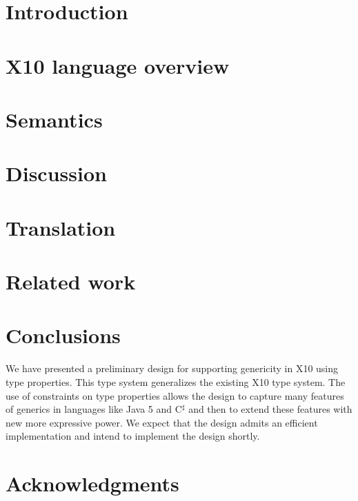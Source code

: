 \documentclass[preprint,nocopyrightspace,9pt]{sigplanconf}
\newcommand\csharp{C$^{\sharp}$\xspace}
\begin{document}
\section{Introduction}
\label{sec:intro}


\section{X10 language overview}
\label{sec:lang}


\section{Semantics}
\label{sec:semantics}


\eat{}

\section{Discussion}
\label{sec:discussion}


\section{Translation}
\label{sec:translation}
\label{sec:impl}


\section{Related work}
\label{sec:related}


\section{Conclusions}
\label{sec:conclusions}


We have presented a preliminary design for supporting genericity
in X10 using type properties.  This type system generalizes the
existing X10 type system.  The use of constraints on type
properties allows
the design to capture many features of generics in languages
like Java 5 and \csharp and then to extend these features with new
more expressive power.
We expect that the design admits an efficient
implementation and intend to implement the design shortly.

\section*{Acknowledgments} 
\end{document}
